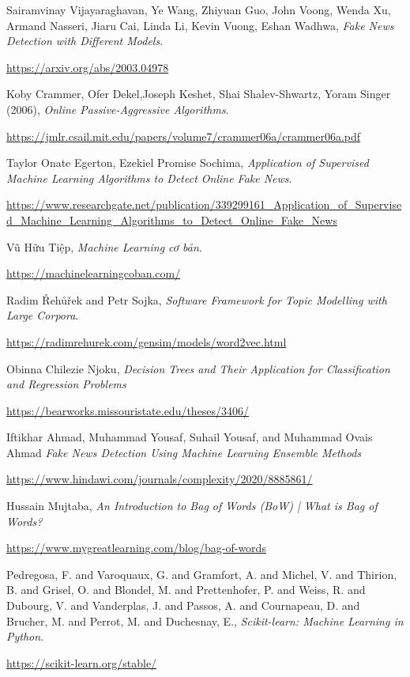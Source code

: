 \documentclass[12pt,a4paper,oneside]{book}
\begin{document}
\newpage
\renewcommand{\bibname}{\bf \LARGE \quad DANH MỤC TÀI LIỆU THAM KHẢO}
\baselineskip
18pt
\begin{thebibliography}{99}
	
	\bibitem{} Sairamvinay Vijayaraghavan, Ye Wang, Zhiyuan Guo, John Voong, Wenda Xu, Armand Nasseri, Jiaru Cai, Linda Li, Kevin Vuong, Eshan Wadhwa,
	\textit{Fake News Detection with Different Models}.
	
	\url{https://arxiv.org/abs/2003.04978}
	
	\bibitem{} Koby Crammer, Ofer Dekel,Joseph Keshet, Shai Shalev-Shwartz, Yoram Singer (2006),
	\textit{Online Passive-Aggressive Algorithms}.

	\url{https://jmlr.csail.mit.edu/papers/volume7/crammer06a/crammer06a.pdf}
	
	\bibitem{}Taylor Onate Egerton, Ezekiel Promise Sochima, \textit{Application of Supervised Machine Learning Algorithms to Detect Online Fake News}.
	
	\url{https://www.researchgate.net/publication/339299161_Application_of_Supervised_Machine_Learning_Algorithms_to_Detect_Online_Fake_News}
	
	\bibitem{} Vũ Hữu Tiệp, \textit{Machine Learning cơ bản}.
	
	\url{https://machinelearningcoban.com/}
	
	\bibitem{} Radim {\v R}eh{\r u}{\v r}ek and Petr Sojka, \textit{Software Framework for Topic Modelling with Large Corpora}.
	
	\url{https://radimrehurek.com/gensim/models/word2vec.html}
	
	\bibitem{}Obinna Chilezie Njoku,
	\textit{Decision Trees and Their Application for Classification and Regression Problems}
	
	\url{https://bearworks.missouristate.edu/theses/3406/}
	
	\bibitem{}Iftikhar Ahmad, Muhammad Yousaf, Suhail Yousaf, and Muhammad Ovais Ahmad
	\textit{Fake News Detection Using Machine Learning Ensemble Methods}
	
	\url{https://www.hindawi.com/journals/complexity/2020/8885861/}
	
	\bibitem{}Hussain Mujtaba, 
	\textit{An Introduction to Bag of Words (BoW) | What is Bag of Words?}
	
	\url{https://www.mygreatlearning.com/blog/bag-of-words}
	
	\bibitem{}Pedregosa, F. and Varoquaux, G. and Gramfort, A. and Michel, V.
	         and Thirion, B. and Grisel, O. and Blondel, M. and Prettenhofer, P.
	         and Weiss, R. and Dubourg, V. and Vanderplas, J. and Passos, A. and
	         Cournapeau, D. and Brucher, M. and Perrot, M. and Duchesnay, E., \textit{Scikit-learn: Machine Learning in {P}ython}.
	         
	\url{https://scikit-learn.org/stable/}
	

	
\end{thebibliography}
\end{document}
